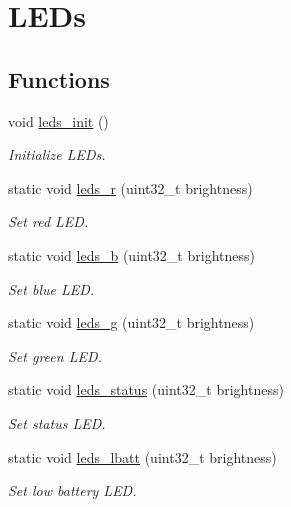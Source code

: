 \hypertarget{group__leds}{}\section{L\+E\+Ds}
\label{group__leds}
\subsection*{Functions}
\begin{DoxyCompactItemize}
\item 
void \hyperlink{group__leds_gacdf2063c18461f6ed748ca0d54029f36}{leds\+\_\+init} ()
\begin{DoxyCompactList}\small\item\em Initialize L\+E\+Ds. \end{DoxyCompactList}\item 
static void \hyperlink{group__leds_ga3059ca5de6fa3eda8695764f79a967ab}{leds\+\_\+r} (uint32\+\_\+t brightness)
\begin{DoxyCompactList}\small\item\em Set red L\+E\+D. \end{DoxyCompactList}\item 
static void \hyperlink{group__leds_ga8d3bb4e738e4b7b0ef8d2ec843158c1e}{leds\+\_\+b} (uint32\+\_\+t brightness)
\begin{DoxyCompactList}\small\item\em Set blue L\+E\+D. \end{DoxyCompactList}\item 
static void \hyperlink{group__leds_ga2d5fd09313de81e1f9ec58f7482684b2}{leds\+\_\+g} (uint32\+\_\+t brightness)
\begin{DoxyCompactList}\small\item\em Set green L\+E\+D. \end{DoxyCompactList}\item 
static void \hyperlink{group__leds_ga960be609eb29a47eedea0f056e151f38}{leds\+\_\+status} (uint32\+\_\+t brightness)
\begin{DoxyCompactList}\small\item\em Set status L\+E\+D. \end{DoxyCompactList}\item 
static void \hyperlink{group__leds_ga91c5211949568d8ae8ea90fc3d4ae3b7}{leds\+\_\+lbatt} (uint32\+\_\+t brightness)
\begin{DoxyCompactList}\small\item\em Set low battery L\+E\+D. \end{DoxyCompactList}\end{DoxyCompactItemize}


